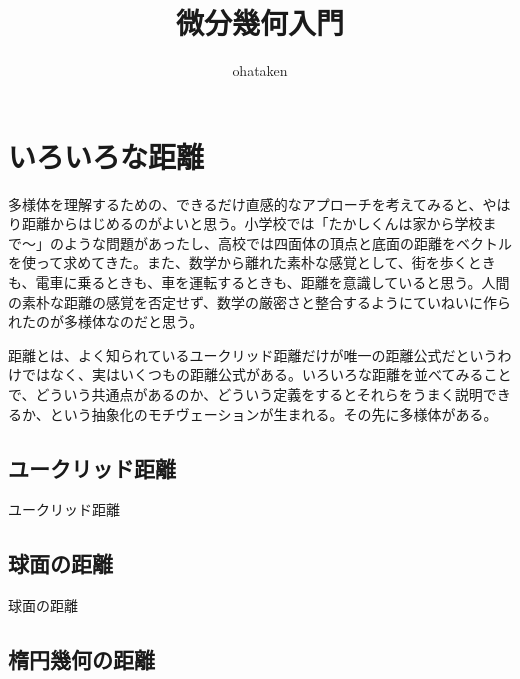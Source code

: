 \title{\huge 微分幾何入門}
\author{ohataken}
\maketitle

\newpage


\section{いろいろな距離}

多様体を理解するための、できるだけ直感的なアプローチを考えてみると、やはり距離からはじめるのがよいと思う。小学校では「たかしくんは家から学校まで〜」のような問題があったし、高校では四面体の頂点と底面の距離をベクトルを使って求めてきた。また、数学から離れた素朴な感覚として、街を歩くときも、電車に乗るときも、車を運転するときも、距離を意識していると思う。人間の素朴な距離の感覚を否定せず、数学の厳密さと整合するようにていねいに作られたのが多様体なのだと思う。

距離とは、よく知られているユークリッド距離だけが唯一の距離公式だというわけではなく、実はいくつもの距離公式がある。いろいろな距離を並べてみることで、どういう共通点があるのか、どういう定義をするとそれらをうまく説明できるか、という抽象化のモチヴェーションが生まれる。その先に多様体がある。

\newpage


\subsection{ユークリッド距離}

ユークリッド距離

\newpage


\subsection{球面の距離}

球面の距離

\newpage


\subsection{楕円幾何の距離}

